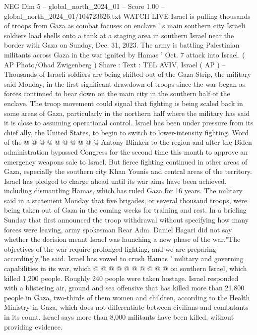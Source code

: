 \begin{textsample}{NEG Dim 5 – global\_north\_2024\_01 – Score 1.00 – global\_north\_2024\_01/104723626.txt}  \label{ex:f5_neg_315}
WATCH LIVE Israel is pulling thousands of troops from Gaza as combat focuses on enclave ' s main southern city Israeli soldiers load shells onto a tank at a staging area in southern Israel near the border with Gaza on Sunday, Dec. 31, 2023.
The army is battling Palestinian militants across Gaza in the war ignited by Hamas ' Oct. 7 attack into Israel. ( AP Photo/Ohad Zwigenberg ) Share : Text : TEL AVIV, Israel ( AP ) -- Thousands of Israeli soldiers are being shifted out of the Gaza Strip, the military said Monday, in the first significant drawdown of troops since the war began as forces continued to bear down on the main city in the southern half of the enclave.
The troop movement could signal that fighting is being scaled back in some areas of Gaza, particularly in the northern half where the military has said it is close to assuming operational control.
Israel has been under pressure from its chief ally, the United States, to begin to switch to lower-intensity fighting.
Word of the @ @ @ @ @ @ @ @ @ @ Antony Blinken to the region and after the Biden administration bypassed Congress for the second time this month to approve an emergency weapons sale to Israel.
But fierce fighting continued in other areas of Gaza, especially the southern city Khan Younis and central areas of the territory.
Israel has pledged to charge ahead until its war aims have been achieved, including dismantling Hamas, which has ruled Gaza for 16 years.
The military said in a statement Monday that five brigades, or several thousand troops, were being taken out of Gaza in the coming weeks for training and rest.
In a briefing Sunday that first announced the troop withdrawal without specifying how many forces were leaving, army spokesman Rear Adm.
Daniel Hagari did not say whether the decision meant Israel was launching a new phase of the war."The objectives of the war require prolonged fighting, and we are preparing accordingly,"he said.
Israel has vowed to crush Hamas ' military and governing capabilities in its war, which @ @ @ @ @ @ @ @ @ @ on southern Israel, which killed 1,200 people.
Roughly 240 people were taken hostage.
Israel responded with a blistering air, ground and sea offensive that has killed more than 21,800 people in Gaza, two-thirds of them women and children, according to the Health Ministry in Gaza, which does not differentiate between civilians and combatants in its count.
Israel says more than 8,000 militants have been killed, without providing evidence.

\end{textsample}
